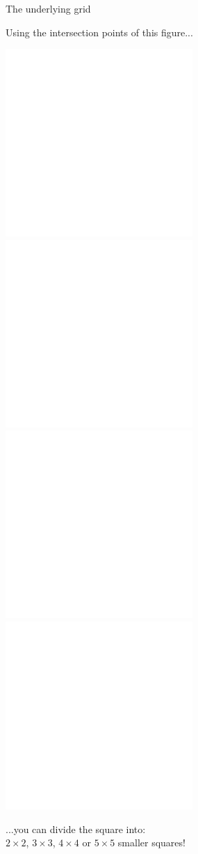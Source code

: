 \documentclass[14pt]{beamer}
\begin{document}

    \begin{frame}{The underlying grid}
        \begin{center}
            Using the intersection points of this figure...

            \bigskip \bigskip

            \includegraphics[height=10ex]{figures/figure002e.pdf}\quad\includegraphics[height=10ex]{figures/figure002f.pdf}\quad\includegraphics[height=10ex]{figures/figure002g.pdf}\quad\includegraphics[height=10ex]{figures/figure002h.pdf}\\

            \bigskip \bigskip

            ...you can divide the square into: \\\medskip$2\!\times\!2$, $3\!\times\!3$, $4\!\times\!4$ or $5\!\times\!5$ smaller squares!
        \end{center}
    \end{frame}

\end{document}
